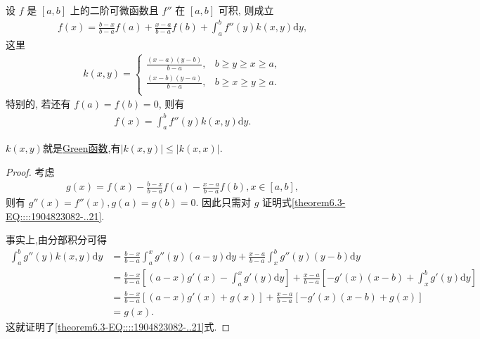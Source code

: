 \documentclass[../../main.tex]{subfiles}%
\begin{document}
\begin{theorem}[带积分型余项的Lagrange插值公式]\label{theorem:带积分型余项的Lagrange插值公式}
设 $f$ 是 $[a,b]$ 上的二阶可微函数且 $f''$ 在 $[a,b]$ 可积, 则成立
\begin{align*}
f(x) = \frac{b-x}{b-a} f(a) + \frac{x-a}{b-a} f(b) + \int_{a}^{b} f''(y) k(x,y) \mathrm{d}y,
\end{align*}
这里
\begin{align*}
k(x,y)=\begin{cases}
\frac{\left( x-a \right) \left( y-b \right)}{b-a},&		b\geqslant y\geqslant x\geqslant a,\\
\frac{\left( x-b \right) \left( y-a \right)}{b-a},&		b\geqslant x\geqslant y\geqslant a.\\
\end{cases}
\end{align*}
特别的, 若还有 $f(a) = f(b) = 0$, 则有
\begin{align}
f(x) = \int_{a}^{b} f''(y) k(x,y) \mathrm{d}y.\label{theorem6.3-EQ::::1904823082-..21}
\end{align}
\end{theorem}
\begin{note}
$k(x,y)$就是\hyperref[theorem:Green函数的性质]{Green函数},有$|k(x,y)|\leqslant  |k(x,x)|$.
\end{note}
\begin{proof}

考虑
\begin{align*}
g(x) = f(x) - \frac{b-x}{b-a} f(a) - \frac{x-a}{b-a} f(b), x \in [a,b],
\end{align*}
则有 $g''(x) = f''(x), g(a) = g(b) = 0$. 因此只需对 $g$ 证明式\eqref{theorem6.3-EQ::::1904823082-..21}.

事实上,由分部积分可得
\begin{align*}
\int_{a}^{b} g''(y) k(x,y) \mathrm{d}y &= \frac{b-x}{b-a} \int_{a}^{x} g''(y) (a-y) \mathrm{d}y + \frac{x-a}{b-a} \int_{x}^{b} g''(y) (y-b) \mathrm{d}y \\
&= \frac{b-x}{b-a} \left[ (a-x) g'(x) - \int_{a}^{x} g'(y) \mathrm{d}y \right] + \frac{x-a}{b-a} \left[ -g'(x) (x-b) + \int_{x}^{b} g'(y) \mathrm{d}y \right] \\
&= \frac{b-x}{b-a} [(a-x) g'(x) + g(x)] + \frac{x-a}{b-a} [-g'(x) (x-b) + g(x)] \\
&= g(x).
\end{align*}
这就证明了\eqref{theorem6.3-EQ::::1904823082-..21}式.

\end{proof}
\end{document}

